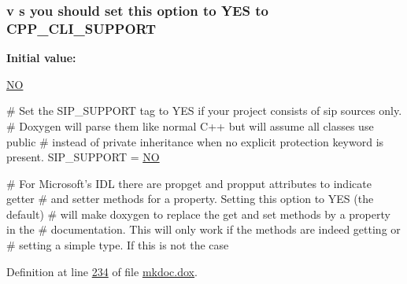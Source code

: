 \hypertarget{mkdoc_8dox_ad95e419f1790fce508581809c7b5dd7f}{
\subsubsection[{C\-P\-P\-\_\-\-C\-L\-I\-\_\-\-S\-U\-P\-P\-O\-R\-T}]{\setlength{\rightskip}{0pt plus 5cm}v s you should set this option to Y\-E\-S to C\-P\-P\-\_\-\-C\-L\-I\-\_\-\-S\-U\-P\-P\-O\-R\-T}}\label{mkdoc_8dox_ad95e419f1790fce508581809c7b5dd7f}
{\bfseries Initial value\-:}
\begin{DoxyCode}
 \hyperlink{mkdoc_8dox_a0f6a46245280dc38baf9600906aa1393}{NO}

\textcolor{preprocessor}{# Set the SIP\_SUPPORT tag to YES if your project consists of sip sources only. }
\textcolor{preprocessor}{}\textcolor{preprocessor}{# Doxygen will parse them like normal C++ but will assume all classes use
       public }
\textcolor{preprocessor}{}\textcolor{preprocessor}{# instead of private inheritance when no explicit protection keyword is
       present.}
\textcolor{preprocessor}{}
SIP\_SUPPORT            = \hyperlink{mkdoc_8dox_a0f6a46245280dc38baf9600906aa1393}{NO}

\textcolor{preprocessor}{# For Microsoft's IDL there are propget and propput attributes to indicate
       getter }
\textcolor{preprocessor}{}\textcolor{preprocessor}{# and setter methods for a property. Setting this option to YES (the default) }
\textcolor{preprocessor}{}\textcolor{preprocessor}{# will make doxygen to replace the get and set methods by a property in the }
\textcolor{preprocessor}{}\textcolor{preprocessor}{# documentation. This will only work if the methods are indeed getting or }
\textcolor{preprocessor}{# setting a simple type. If this is not the case}
\end{DoxyCode}


Definition at line \hyperlink{mkdoc_8dox_source_l00234}{234} of file \hyperlink{mkdoc_8dox_source}{mkdoc.\-dox}.

